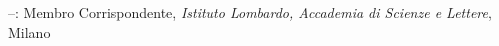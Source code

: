 \documentclass[reqno,11pt]{article}
\let\mysec\subsubsection
\newcommand{\present}{}
\newcommand{\npind}{\hangindent\parindent
  \noindent}
\let\mysec\subsubsection
\newcommand{\switch}[2]{\iflanguage{italian}{#1}{#2}}
\theoremstyle{plain}
\begin{document}
\hangindent \parindent
{}--\present: Membro Corrispondente, \emph{Istituto
  Lombardo, Accademia di Scienze e Lettere}, Milano



























\end{document}
